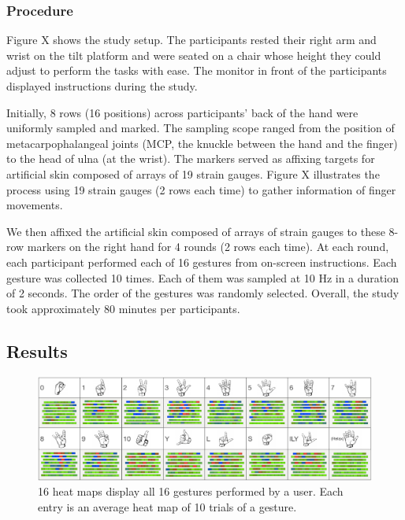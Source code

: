 \documentclass{sigchi}
\begin{document}

\subsubsection{Procedure}
Figure X shows the study setup. The participants rested their right arm and wrist on the tilt platform and were seated on a chair whose height they could adjust to perform the tasks with ease. The monitor in front of the participants displayed instructions during the study.

Initially, 8 rows (16 positions) across participants’ back of the hand were uniformly sampled and marked. The sampling scope ranged from the position of metacarpophalangeal joints (MCP, the knuckle between the hand and the finger) to the head of ulna (at the wrist).%
 The markers served as affixing targets for artificial skin composed of arrays of 19 strain gauges. 
Figure X illustrates the process using 19 strain gauges (2 rows each time) to gather information of finger movements.

We then affixed the artificial skin composed of arrays of strain gauges to these 8-row markers on the right hand for 4 rounds (2 rows each time). 
At each round, each participant performed each of 16 gestures from on-screen instructions. Each gesture was collected 10 times. Each of them was sampled at 10 Hz in a duration of 2 seconds.
The order of the gestures was randomly selected. 
Overall, the study took approximately 80 minutes per participants.

\subsection{Results}

\begin{figure}
 \begin{center}
  \includegraphics[width=2\columnwidth]{figures/user16GesturesSV.pdf}
  \caption{ 16 heat maps display all 16 gestures performed by a user. Each entry is an average heat map of 10 trials of a gesture.
  }
  \label{fig:user16GesturesSV}
  \end{center}
\end{figure}
\end{document}
